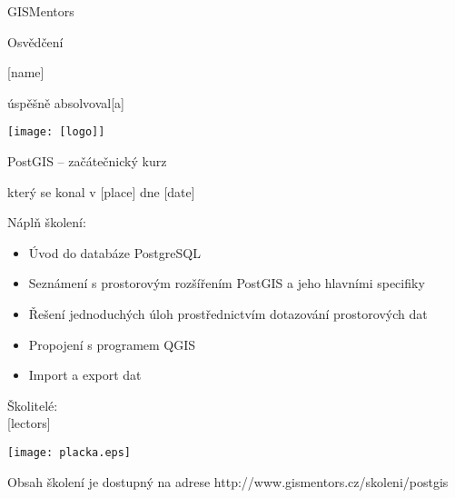 \documentclass[12pt, a4paper]{letter}
\begin{document}
\pagestyle{empty}
\begin{center}

{\Large GISMentors}

{\Huge Osvědčení}

{\Large [name]}

úspěšně absolvoval[a]

\texttt{[image: [logo]]}

{\Large PostGIS -- začátečnický kurz}

který se konal v [place] dne [date]
\end{center}

Náplň školení:

\begin{itemize}
    \item Úvod do databáze PostgreSQL
    \item Seznámení s prostorovým rozšířením PostGIS a jeho hlavními specifiky
    \item Řešení jednoduchých úloh prostřednictvím dotazování prostorových dat
    \item Propojení s programem QGIS
    \item Import a export dat
\end{itemize}

\vfill
\parbox{7cm}{

        Školitelé:\\

        [lectors]
}
\hfill
\parbox{3cm}{
    \texttt{[image: placka.eps]}
}

\vfill

\begin{center}
{\footnotesize Obsah školení je dostupný na adrese
http://www.gismentors.cz/skoleni/postgis}
\end{center}
\end{document}
